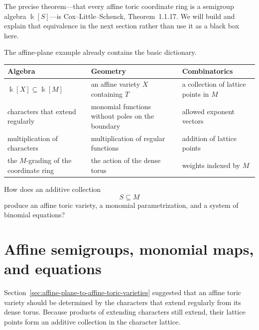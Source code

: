 The precise theorem—that every affine toric coordinate ring is a
semigroup algebra \(\Bbbk[S]\)—is Cox--Little--Schenck,
Theorem~1.1.17. We will build and explain that equivalence in the next
section rather than use it as a black box here.

\begin{threedictionaries}
The affine-plane example already contains the basic dictionary.

\medskip

\begin{center}
\small
\begin{tabularx}{\linewidth}{@{}
  >{\raggedright\arraybackslash}X
  >{\raggedright\arraybackslash}X
  >{\raggedright\arraybackslash}X@{}}
\toprule
\textbf{Algebra}
&
\textbf{Geometry}
&
\textbf{Combinatorics}
\\
\midrule
\(\Bbbk[X]\subseteq\Bbbk[M]\)
&
an affine variety \(X\) containing \(T\)
&
a collection of lattice points in \(M\)
\\[1mm]
characters that extend regularly
&
monomial functions without poles on the boundary
&
allowed exponent vectors
\\[1mm]
multiplication of characters
&
multiplication of regular functions
&
addition of lattice points
\\[1mm]
the \(M\)-grading of the coordinate ring
&
the action of the dense torus
&
weights indexed by \(M\)
\\
\bottomrule
\end{tabularx}
\end{center}
\end{threedictionaries}

\begin{guidingquestion}
How does an additive collection
\[
S\subseteq M
\]
produce an affine toric variety, a monomial parametrization, and a
system of binomial equations?
\end{guidingquestion}


\section{Affine semigroups, monomial maps, and equations}
\label{sec:affine-semigroups-monomial-maps}

Section~\ref{sec:affine-plane-to-affine-toric-varieties} suggested
that an affine toric variety should be determined by the characters
that extend regularly from its dense torus. Because products of
extending characters still extend, their lattice points form an
additive collection in the character lattice.

